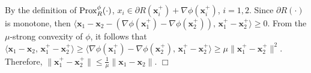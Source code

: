 \documentclass[twoside,11pt]{article}
\newcommand{\E}{\mathbb{E}}
\newcommand{\cF}{\mathcal F}
\newcommand{\cU}{\mathcal U}
\def\inprod#1#2{\langle#1,\,#2\rangle}
\def\vx{{\bm{x}}}
\begin{document}
{\medskip
{}
By the definition of ${\rm Prox}_R^\phi(\cdot)$,  $x_i\in\partial R(\vx_i^+)+\nabla\phi(\vx^+_i)$, $i=1,2$. Since $\partial R(\cdot)$ is monotone, then 
 $\inprod{\vx_1-\vx_2-(\nabla\phi(\vx^+_1)-\nabla\phi(\vx^+_2))}{\vx^+_1-\vx^+_2}\geq0$. From the $\mu$-strong convexity of $\phi$, it follows that $\inprod{\vx_1-\vx_2}{\vx^+_1-\vx^+_2}\geq\inprod{\nabla\phi(\vx^+_1)-\nabla\phi(\vx^+_2)}{\vx^+_1-\vx^+_2}\geq\mu\|\vx^+_1-\vx^+_2\|^2$. Therefore, $\|\vx^+_1-\vx^+_2\|\leq\frac{1}{\mu}\|\vx_1-\vx_2\|$. $\Box$

}
\end{document}
